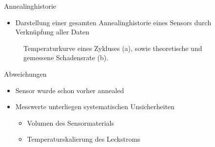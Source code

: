 \documentclass[aspectratio=43, 10pt]{beamer}
\begin{document}
\begin{frame}{Annealinghistorie}
  \begin{itemize}
    \item Darstellung einer gesamten Annealinghistorie eines Sensors durch Verknüpfung aller Daten
  \end{itemize}
  \begin{figure}
      \caption{Temperaturkurve eines Zykluses (a), sowie theoretische und gemessene Schadensrate (b).}
  \end{figure}

\end{frame}

\begin{frame}{Abweichungen}
  \begin{itemize}
    \item Sensor wurde schon vorher annealed
    \medskip
    \item Messwerte unterliegen systematischen Unsicherheiten
    \medskip
    \begin{itemize}
      \item Volumen des Sensormaterials
      \medskip
      \item Temperaturskalierung des Leckstroms
    \end{itemize}
  \end{itemize}
\end{frame}
\end{document}
